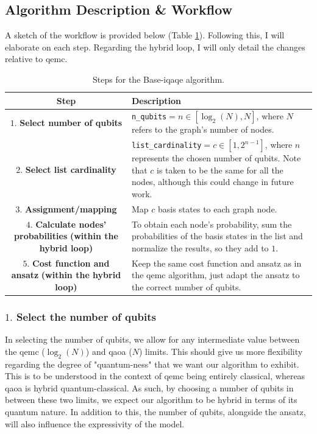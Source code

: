 \subsection{Algorithm Description \& Workflow}
\label{subsection:iQAQE Description_Workflow}
A sketch of the workflow is provided below (Table \ref{tab:iQAQE_Steps}). Following this, I will elaborate on each step. Regarding the hybrid loop, I will only detail the changes relative to \acrshort{qemc}.
\begin{table}[h!]
    \centering
    \begin{tabular}{|c|p{9.5cm}|}
    \hline
    \textbf{Step} & \textbf{Description} \\ \hline
    $1.$ \textbf{Select number of qubits} & \texttt{n\_qubits}$ = n \in \left[\log_2{(N)}, N\right]$, where $N$ refers to the graph's number of nodes. \\ \hline
    $2.$ \textbf{Select list cardinality} & \texttt{list\_cardinality}$ = c \in \left[1, 2^{n - 1}\right]$, where $n$ represents the chosen number of qubits. Note that $c$ is taken to be the same for all the nodes, although this could change in future work. \\ \hline
    $3.$ \textbf{Assignment/mapping} & Map $c$ basis states to each graph node. \\ \hline
    \makecell{$4.$ \textbf{Calculate nodes' probabilities} \\ \textbf{(within the hybrid loop)}} & To obtain each node's probability, sum the probabilities of the basis states in the list and normalize the results, so they add to $1$. \\ \hline
    \makecell{$5.$ \textbf{Cost function and ansatz} \\ \textbf{(within the hybrid loop)}} & Keep the same cost function and ansatz as in the \acrshort{qemc} algorithm, just adapt the ansatz to the correct number of qubits. \\ \hline
    \end{tabular}
    \caption{Steps for the Base-\acrshort{iqaqe} algorithm.}
    \label{tab:iQAQE_Steps}
\end{table}

\subsubsection*{$1.$ Select the number of qubits}
In selecting the number of qubits, we allow for any intermediate value between the \acrshort{qemc} ($\log_2{(N)}$) and \acrshort{qaoa} ($N$) limits. This should give us more flexibility regarding the degree of "quantum-ness" that we want our algorithm to exhibit. This is to be understood in the context of \acrshort{qemc} being entirely classical, whereas \acrshort{qaoa} is hybrid quantum-classical. As such, by choosing a number of qubits in between these two limits, we expect our algorithm to be hybrid in terms of its quantum nature. In addition to this, the number of qubits, alongside the ansatz, will also influence the expressivity of the model.

